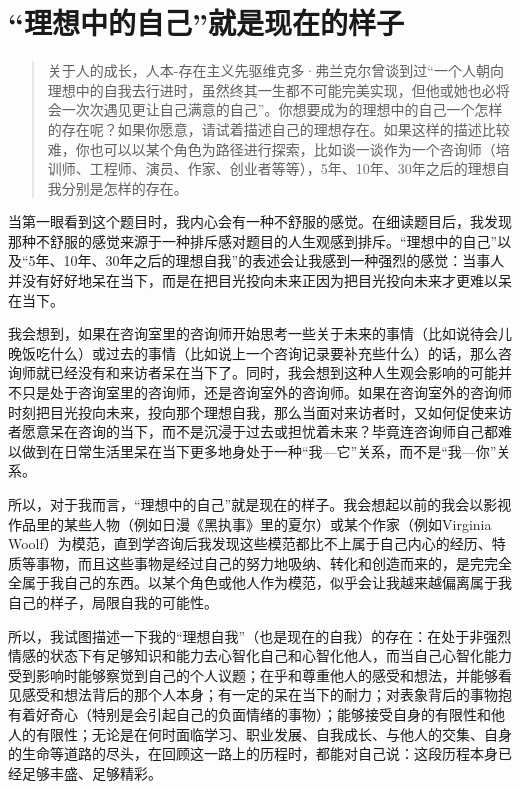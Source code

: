 \chapter{“理想中的自己”就是现在的样子}





\blockquote{关于人的成长，人本-存在主义先驱维克多·弗兰克尔曾谈到过“一个人朝向理想中的自我去行进时，虽然终其一生都不可能完美实现，但他或她也必将会一次次遇见更让自己满意的自己”。你想要成为的理想中的自己一个怎样的存在呢？如果你愿意，请试着描述自己的理想存在。如果这样的描述比较难，你也可以以某个角色为路径进行探索，比如谈一谈作为一个咨询师（培训师、工程师、演员、作家、创业者等等），5年、10年、30年之后的理想自我分别是怎样的存在。}

当第一眼看到这个题目时，我内心会有一种不舒服的感觉。在细读题目后，我发现那种不舒服的感觉来源于一种排斥感\pozhehao{}对题目的人生观感到排斥。“理想中的自己”以及“5年、10年、30年之后的理想自我”的表述会让我感到一种强烈的感觉：当事人并没有好好地呆在当下，而是在把目光投向未来\pozhehao{}正因为把目光投向未来才更难以呆在当下。

我会想到，如果在咨询室里的咨询师开始思考一些关于未来的事情（比如说待会儿晚饭吃什么）或过去的事情（比如说上一个咨询记录要补充些什么）的话，那么咨询师就已经没有和来访者呆在当下了。同时，我会想到这种人生观会影响的可能并不只是处于咨询室里的咨询师，还是咨询室外的咨询师。如果在咨询室外的咨询师时刻把目光投向未来，投向那个理想自我，那么当面对来访者时，又如何促使来访者愿意呆在咨询的当下，而不是沉浸于过去或担忧着未来？毕竟连咨询师自己都难以做到在日常生活里呆在当下\pozhehao{}更多地身处于一种“我—它”关系，而不是“我—你”关系。

所以，对于我而言，“理想中的自己”就是现在的样子。我会想起以前的我会以影视作品里的某些人物（例如日漫《黑执事》里的夏尔）或某个作家（例如Virginia Woolf）为模范，直到学咨询后我发现这些模范都比不上属于自己内心的经历、特质等事物，而且这些事物是经过自己的努力地吸纳、转化和创造而来的，是完完全全属于我自己的东西。以某个角色或他人作为模范，似乎会让我越来越偏离属于我自己的样子，局限自我的可能性。

所以，我试图描述一下我的“理想自我”（也是现在的自我）的存在：在处于非强烈情感的状态下有足够知识和能力去心智化自己和心智化他人，而当自己心智化能力受到影响时能够察觉到自己的个人议题；在乎和尊重他人的感受和想法，并能够看见感受和想法背后的那个人本身；有一定的呆在当下的耐力；对表象背后的事物抱有着好奇心（特别是会引起自己的负面情绪的事物）；能够接受自身的有限性和他人的有限性；无论是在何时面临学习、职业发展、自我成长、与他人的交集、自身的生命等道路的尽头，在回顾这一路上的历程时，都能对自己说：这段历程本身已经足够丰盛、足够精彩。

